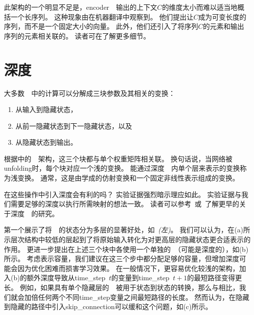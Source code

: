 此架构的一个明显不足是，\gls{encoder}~~输出的上下文$C$的维度太小而难以适当地概括一个长序列。
这种现象由\cite{Bahdanau-et-al-2015}在机器翻译中观察到。
他们提出让$C$成为可变长度的序列，而不是一个固定大小的向量。
此外，他们还引入了将序列$C$的元素和输出序列的元素相关联的。
读者可在了解更多细节。


\section{深度}
\label{sec:deep_recurrent_networks}
大多数~~中的计算可以分解成三块参数及其相关的变换：
\begin{enumerate}
 \item 从输入到隐藏状态，
 \item 从前一隐藏状态到下一隐藏状态，以及
 \item 从隐藏状态到输出。
\end{enumerate}
根据中的~~架构，这三个块都与单个权重矩阵相关联。
换句话说，当网络被\gls{unfolding}时，每个块对应一个浅的变换。
能通过深度~~内单个层来表示的变换称为浅变换。
通常，这是由学成的仿射变换和一个固定非线性表示组成的变换。

在这些操作中引入深度会有利的吗？
实验证据\citep{Graves-et-al-2013,Pascanu-et-al-2014a}强烈暗示理应如此。
实验证据与我们需要足够的深度以执行所需映射的想法一致。
读者可以参考~\cite{Schmidhuber-1992,Hihi-Bengio-1996}或~\cite{Jaeger-2007a}了解更早的关于深度~~的研究。

\cite{Graves-et-al-2013}第一个展示了将~~的状态分为多层的显著好处，如~\emph{(左)}。
我们可以认为，在(a)所示层次结构中较低的层起到了将原始输入转化为对更高层的隐藏状态更合适表示的作用。
\cite{Pascanu-et-al-2014a}更进一步提出在上述三个块中各使用一个单独的~（可能是深度的），如(b)所示。
考虑表示容量，我们建议在这三个步中都分配足够的容量，但增加深度可能会因为优化困难而损害学习效果。
在一般情况下，更容易优化较浅的架构，加入(b)的额外深度导致从\gls{time_step}~$t$的变量到\gls{time_step}~$t+1$的最短路径变得更长。
例如，如果具有单个隐藏层的~~被用于状态到状态的转换，那么与相比，我们就会加倍任何两个不同\gls{time_step}变量之间最短路径的长度。
然而\cite{Pascanu-et-al-2014a}认为，在隐藏到隐藏的路径中引入\gls{skip_connection}可以缓和这个问题，如(c)所示。

